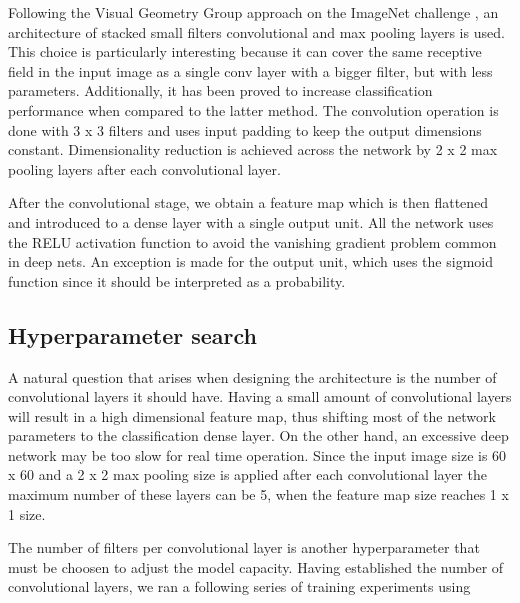         Following the Visual Geometry Group approach on the ImageNet challenge \cite{Simonyan14c}, an architecture of stacked small filters convolutional and max pooling layers is used. This choice is particularly interesting because it can cover the same receptive field in the input image as a single conv layer with a bigger filter, but with less parameters. Additionally, it has been proved to increase classification performance when compared to the latter method. The convolution operation is done with 3 x 3 filters and uses input padding to keep the output dimensions constant. Dimensionality reduction is achieved across the network by 2 x 2 max pooling layers after each convolutional layer.

        After the convolutional stage, we obtain a feature map which is then flattened and introduced to a dense layer with a single output unit. All the network uses the RELU \cite{nair2010relu} activation function to avoid the vanishing gradient problem common in deep nets. An exception is made for the output unit, which uses the sigmoid function since it should be interpreted as a probability.

    \subsection{Hyperparameter search}
        A natural question that arises when designing the architecture is the number of convolutional layers it should have. Having a small amount of convolutional layers will result in a high dimensional feature map, thus shifting most of the network parameters to the classification dense layer. On the other hand, an excessive deep network may be too slow for real time operation. Since the input image size is 60 x 60 and a 2 x 2 max pooling size is applied after each convolutional layer the maximum number of these layers can be 5, when the feature map size reaches 1 x 1 size.


        \iffalse To choose this hyperparameter we ran a few training experiments with 20 epochs, 32 filters per conv layer and evaluated the Matthews correlation coefficient \cite{evaluationMetrics} on the validation set. Although the different network configurations presented similar result metrics, the 2 and 5 layer configurations showed the best results. We have decided for the latter given it has a more compact feature representation: its last conv layer has 16 dimensions, versus the 3600 dimensions of 2 conv layer network. \fi

        The number of filters per convolutional layer is another hyperparameter that must be choosen to adjust the model capacity.  Having established the number of convolutional layers, we ran a following series of training experiments using

